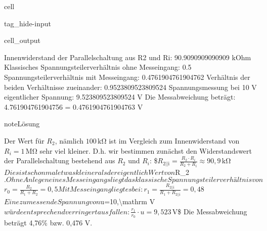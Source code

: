 \documentclass[letterpaper,10pt,english]{jupyterBook}
\begin{document}
\begin{sphinxuseclass}{cell}
\begin{sphinxuseclass}{tag_hide-input}\begin{sphinxVerbatimOutput}

\begin{sphinxuseclass}{cell_output}
\begin{sphinxVerbatim}[commandchars=\\\{\}]
Innenwiderstand der Parallelschaltung aus R\PYGZus{}2 und R\PYGZus{}i:  90.9090909090909 kOhm
Klassisches Spannungsteilerverhältnis ohne Messeingang:  0.5
Spannungsteilerverhältnis mit Messeingang:  0.4761904761904762
Verhältnis der beiden Verhältnisse zueinander:  0.9523809523809524
Spannungsmessung bei  10 V eigentlicher Spannung:  9.523809523809524 V
Die Messabweichung beträgt:  4.761904761904756 \PYGZpc{} =  \PYGZhy{}0.4761904761904763 V
\end{sphinxVerbatim}

\end{sphinxuseclass}\end{sphinxVerbatimOutput}

\end{sphinxuseclass}
\end{sphinxuseclass}
\begin{sphinxadmonition}{note}{Lösung}

\sphinxAtStartPar
Der Wert für \(R_2\), nämlich \(100\,\mathrm{k\Omega}\) ist im Vergleich zum Innenwiderstand von \(R_i = 1\,\mathrm{M\Omega}\) sehr viel kleiner. D.h. wir bestimmen zunächst den Widerstandswert der Parallelschaltung bestehend aus \(R_2\) und \(R_i\):
\$\(R_\mathrm{2||i} = \frac{R_2 \cdot R_i}{R_2 + R_i} \approx 90,9\,\mathrm{k\Omega}\)\(
Dies ist schon mal etwas kleiner als der eigentlich Wert von \)R\_2\(. 
Ohne Anlegen eines Messeingangs liegt das klassische Spannungsteilerverhältnis von 
\)\(r_0 = \frac{R_2}{R_1+R_2} = 0,5\)\(
Mit Messeingang liegt es bei:
\)\(r_1 = \frac{R_\mathrm{2||i}}{R_1+R_\mathrm{2||i}} = 0,48\)\(
Eine zu messende Spannung von \)u=10,\textbackslash{}mathrm V\( würde entsprechend verringert ausfallen: 
\)\(\frac{r_1}{r_0}\cdot u = 9,523\,\mathrm{V}\)\$
Die Messabweichung beträgt \sphinxhyphen{}4,76\% bzw. \sphinxhyphen{}0,476 V.
\end{sphinxadmonition}
\end{document}
